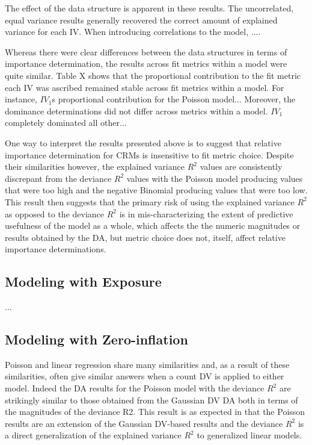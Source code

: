 \documentclass[ShortAfour,times,sageapa]{sagej}
\begin{document}
	The effect of the data structure is apparent in these results.  
	The uncorrelated, equal variance results generally recovered the correct amount of explained variance for each IV.  
	When introducing correlations to the model, ....
	
	Whereas there were clear differences between the data structures in terms of importance determination, the results across fit metrics within a model were quite similar.
	Table X shows that the proportional contribution to the fit metric each IV was ascribed remained stable across fit metrics within a model.
	For instance, $IV_1$s proportional contribution for the Poisson model...
	Moreover, the dominance determinations did not differ across metrics within a model.
	$IV_1$ completely dominated all other...
	
	One way to interpret the results presented above is to suggest that relative importance determination for CRMs is insensitive to fit metric choice. 
	Despite their similarities however, the explained variance $R^2$ values are consistently discrepant from the deviance $R^2$ values with the Poisson model producing values that were too high and the negative Binomial producing values that were too low. 
	This result then suggests that the primary risk of using the explained variance $R^2$ as opposed to the deviance $R^2$ is in mis-characterizing the extent of predictive usefulness of the model as a whole, which affects the the numeric magnitudes or results obtained by the DA, but metric choice does not, itself, affect relative importance determinations.
	
	\subsection{Modeling with Exposure}
	
	...
	
	\subsection{Modeling with Zero-inflation}
	
	
	
	Poisson and linear regression share many similarities and, as a result of these similarities, often give similar answers when a count DV is applied to either model.
	Indeed the DA results for the Poisson model with the deviance $R^2$ are strikingly similar to those obtained from the Gaussian DV DA both in terms of the magnitudes of the deviance R2.  
	This result is as expected in that the Poisson results are an extension of the Gaussian DV-based results and the deviance $R^2$ is a direct generalization of the explained variance $R^2$ to generalized linear models.
	
\end{document}
